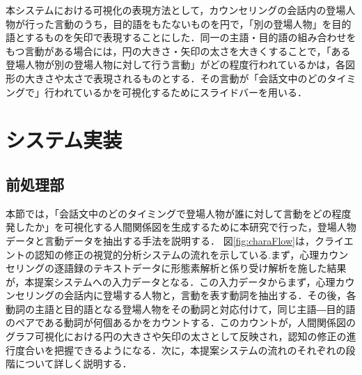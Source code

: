 \documentclass[shuuron]{kuee}
\begin{document}
%

本システムにおける可視化の表現方法として，カウンセリングの会話内の登場人物が行った言動のうち，目的語をもたないものを円で，「別の登場人物」を目的語とするものを矢印で表現することにした．同一の主語・目的語の組み合わせをもつ言動がある場合には，円の大きさ・矢印の太さを大きくすることで，「ある登場人物が別の登場人物に対して行う言動」がどの程度行われているかは，各図形の大きさや太さで表現されるものとする．その言動が「会話文中のどのタイミングで」行われているかを可視化するためにスライドバーを用いる．







\section{システム実装} %

\subsection{前処理部} %


本節では，「会話文中のどのタイミングで登場人物が誰に対して言動をどの程度発したか」を可視化する人間関係図を生成するために本研究で行った，登場人物データと言動データを抽出する手法を説明する．%
図\ref{fig:charaFlow}は，クライエントの認知の修正の視覚的分析システムの流れを示している.まず，心理カウンセリングの逐語録のテキストデータに形態素解析と係り受け解析を施した結果が，本提案システムへの入力データとなる．この入力データからまず，心理カウンセリングの会話内に登場する人物と，言動を表す動詞を抽出する．その後，各動詞の主語と目的語となる登場人物をその動詞と対応付けて，同じ主語―目的語のペアである動詞が何個あるかをカウントする．このカウントが，人間関係図のグラフ可視化における円の大きさや矢印の太さとして反映され，認知の修正の進行度合いを把握できるようになる．次に，本提案システムの流れのそれぞれの段階について詳しく説明する．
\end{document}
